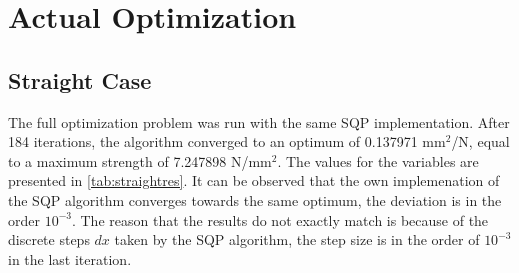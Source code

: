 
\section{Actual Optimization}
\subsection{Straight Case}
The full optimization problem was run with the same SQP implementation. After 184 iterations, the algorithm converged to an optimum of 0.137971 mm$^2$/N, equal to a maximum strength of 7.247898 N/mm$^2$. The values for the variables are presented in \autoref{tab:straightres}. It can be observed that the own implemenation of the SQP algorithm converges towards the same optimum, the deviation is in the order $10^{-3}$. The reason that the results do not exactly match is because of the discrete steps $dx$ taken by the SQP algorithm, the step size is in the order of $10^{-3}$ in the last iteration. 


